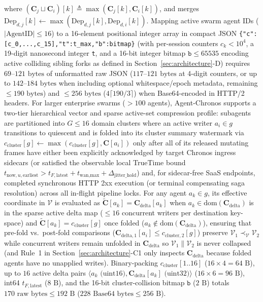 \documentclass[conference,10pt]{IEEEtran}
\begin{document}
\begin{enumerate}
    where $(\mathbf{C}_j \sqcup \mathbf{C}_i)[k] \triangleq \max(\mathbf{C}_j[k], \mathbf{C}_i[k])$, and merges $\text{Dep}_{d,j}[k] \leftarrow \max(\text{Dep}_{d,j}[k], \text{Dep}_{d,i}[k])$. Mapping active swarm agent IDs ($|\text{AgentID}| \le 16$) to a 16-element positional integer array in compact JSON \texttt{\{"c":[c\_0,\allowbreak ...,\allowbreak c\_15],\allowbreak "t":t\_max,\allowbreak "b":bitmap\}} (with per-session counters $c_k < 10^4$, a 19-digit nanosecond integer \texttt{t}, and a 16-bit integer bitmap $\texttt{b} \le 65535$ encoding active colliding sibling forks as defined in Section~\ref{sec:architecture}-D) requires $69\text{--}121\text{ bytes}$ of unformatted raw JSON ($117\text{--}121\text{ bytes}$ at 4-digit counters, or up to $142\text{--}184\text{ bytes}$ when including optional whitespace/epoch metadata, remaining $\le 190\text{ bytes}$) and $\le 256\text{ bytes}$ ($4\lceil 190/3 \rceil$) when Base64-encoded in HTTP/2 headers. For larger enterprise swarms ($>100$ agents), Agent-Chronos supports a two-tier hierarchical vector and sparse active-set compression profile: subagents are partitioned into $G \le 16$ domain clusters where an active writer $a_i \in g$ transitions to quiescent and is folded into its cluster summary watermark via $c_{\text{cluster}}[g] \leftarrow \max(c_{\text{cluster}}[g], \mathbf{C}[a_i])$ only after all of its released mutating frames have either been explicitly acknowledged by target Chronos ingress sidecars (or satisfied the observable local TrueTime bound $t_{\text{now},u,\text{earliest}} > t_{F,\text{latest}} + t_{\text{wan,max}} + \Delta_{\text{jitter\_hold}}$) and, for sidecar-free SaaS endpoints, completed synchronous HTTP 2xx execution (or terminal compensating saga resolution) across all in-flight pipeline locks. For any agent $a_k \in g$, its effective coordinate in $\mathcal{V}$ is evaluated as $\tilde{\mathbf{C}}[a_k] = \mathbf{C}_{\text{delta}}[a_k]$ when $a_k \in \text{dom}(\mathbf{C}_{\text{delta}})$ is in the sparse active delta map ($\le 16$ concurrent writers per destination key-space) and $\tilde{\mathbf{C}}[a_k] = c_{\text{cluster}}[g]$ once folded ($a_k \notin \text{dom}(\mathbf{C}_{\text{delta}})$), ensuring that pre-fold vs.\ post-fold comparisons ($\mathbf{C}_{\text{delta},1}[a_i] \le c_{\text{cluster},2}[g]$) preserve $\mathcal{V}_1 \prec_{\mathcal{V}} \mathcal{V}_2$ while concurrent writers remain unfolded in $\mathbf{C}_{\text{delta}}$ so $\mathcal{V}_1 \parallel \mathcal{V}_2$ is never collapsed (and Rule~1 in Section~\ref{sec:architecture}-C1 only inspects $\mathbf{C}_{\text{delta}}$ because folded agents have no unapplied writes). Binary-packing $c_{\text{cluster}}[1..16]$ ($16 \times 4 = 64\text{ B}$), up to $16$ active delta pairs $\langle a_k\text{ (uint16)}, \mathbf{C}_{\text{delta}}[a_k]\text{ (uint32)}\rangle$ ($16 \times 6 = 96\text{ B}$), int64 $t_{F,\text{latest}}$ ($8\text{ B}$), and the 16-bit cluster-collision bitmap $\texttt{b}$ ($2\text{ B}$) totals $170\text{ raw bytes} \le 192\text{ B}$ ($228\text{ Base64 bytes} \le 256\text{ B}$).
\end{enumerate}
\end{document}
